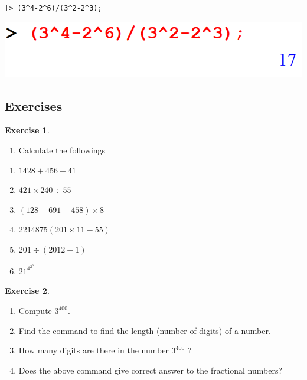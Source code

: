 \documentclass[
]{book}
\providecommand{\tightlist}{%
  \setlength{\itemsep}{0pt}\setlength{\parskip}{0pt}}
\theoremstyle{definition}
\theoremstyle{definition}
\theoremstyle{definition}
\newtheorem{exercise}{Exercise}[chapter]
\theoremstyle{definition}
\theoremstyle{remark}
\begin{document}
\begin{verbatim}
[> (3^4-2^6)/(3^2-2^3);
\end{verbatim}

\includegraphics{figures/Lesson 1/fig16.png}

\subsection{Exercises}\label{exercises-2}

\begin{exercise}
\protect\hypertarget{exr:unnamed-chunk-62}{}\label{exr:unnamed-chunk-62}\leavevmode

\begin{enumerate}
\def\labelenumi{\arabic{enumi}.}
\tightlist
\item
  Calculate the followings
\end{enumerate}

\begin{enumerate}
\def\labelenumi{\roman{enumi}.}
\tightlist
\item
  \(1428 + 456 − 41\)
\item
  \(421 × 240 ÷ 55\)
\item
  \((128 − 691 + 458) × 8\)
\item
  \(2214875(201 × 11 − 55)\)
\item
  \(201 ÷ (2012 − 1)\)
\item
  \(21^{4^{2^3}}\)
\end{enumerate}

\end{exercise}

\begin{exercise}
\protect\hypertarget{exr:unnamed-chunk-63}{}\label{exr:unnamed-chunk-63}\leavevmode

\begin{enumerate}
\def\labelenumi{\roman{enumi}.}
\tightlist
\item
  Compute \(3^{400}\).
\item
  Find the command to find the length (number of digits) of a number.
\item
  How many digits are there in the number \(3^{400}\) ?
\item
  Does the above command give correct answer to the fractional numbers?
\end{enumerate}

\end{exercise}
\end{document}
